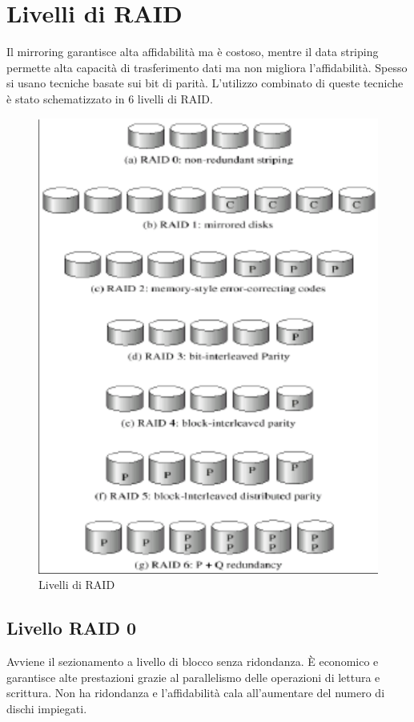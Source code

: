 \section{Livelli di RAID}
Il mirroring garantisce alta affidabilit\`a ma \`e costoso, mentre il data striping permette alta capacit\`a di trasferimento dati ma non migliora l'affidabilit\`a. Spesso si usano
tecniche basate sui bit di parit\`a. L'utilizzo combinato di queste tecniche \`e stato schematizzato in $6$ livelli di RAID. 
\begin{center}
\begin{figure}[h]
	\includegraphics[scale=0.2]{Pictures/RAID.png}
	\caption{Livelli di RAID}
\end{figure}
\end{center}
\subsection{Livello RAID 0}
Avviene il sezionamento a livello di blocco senza ridondanza. \`E economico e garantisce alte prestazioni grazie al parallelismo delle operazioni di lettura e scrittura. Non ha 
ridondanza e l'affidabilit\`a cala all'aumentare del numero di dischi impiegati. 
